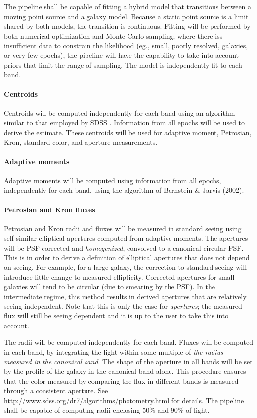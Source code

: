 \documentclass[12pt]{article}
\begin{document}
The pipeline shall be capable of fitting a hybrid model that transitions between a moving point source and a galaxy model. Because a static point source is a limit shared by both models, the transition is continuous. Fitting will be performed by both numerical optimization and Monte Carlo sampling; where there iss insufficient data to constrain the likelihood (eg., small, poorly resolved, galaxies, or very few epochs), the pipeline will have the capability to take into account priors that limit the range of sampling. The model is independently fit to each band.

\paragraph{Centroids} Centroids will be computed independently for each band using an algorithm similar to that employed by SDSS \cite{LuptonPhoto}. Information from all epochs will be used to derive the estimate. These centroids will be used for adaptive moment, Petrosian, Kron, standard color, and aperture measurements.

\paragraph{Adaptive moments} Adaptive moments will be computed using information from all epochs, independently for each band, using the algorithm of Bernstein \& Jarvis (2002).

\paragraph{Petrosian and Kron fluxes} Petrosian and Kron radii and fluxes will be measured in standard seeing using self-similar elliptical apertures computed from adaptive moments. The apertures will be PSF-corrected and \emph{homogenized}, convolved to a canonical circular PSF\@. This is in order to derive a definition of elliptical apertures that does not depend on seeing. For example, for a large galaxy, the correction to standard seeing will introduce little change to measured ellipticity. Corrected apertures for small galaxies will tend to be circular (due to smearing by the PSF). In the intermediate regime, this method results in derived apertures that are relatively seeing-independent. Note that this is only the case for \emph{apertures}; the measured flux will still be seeing dependent and it is up to the user to take this into account.

The radii will be computed independently for each band. Fluxes will be computed in each band, by integrating the light within some multiple of \emph{the radius measured in the canonical band}. The shape of the aperture in all bands will be set by the profile of the galaxy in the canonical band alone. This procedure ensures that the color measured by comparing the flux in different bands is measured through a consistent aperture. See \url{http://www.sdss.org/dr7/algorithms/photometry.html} for details. The pipeline shall be capable of computing radii enclosing 50\% and 90\% of light.
\end{document}
